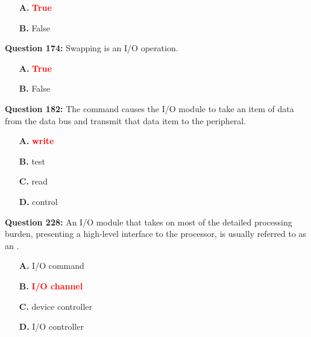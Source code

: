 \documentclass[12pt,a4paper]{article}
\begin{document}
\begin{itemize}
    \item[\textbf{A.}] \textcolor{red}{\textbf{True}}
    \item[\textbf{B.}] False
\end{itemize}

\vspace{0.5cm}

\vspace{0.5cm}

\textbf{Question 174:} Swapping is an I/O operation.

\begin{itemize}
    \item[\textbf{A.}] \textcolor{red}{\textbf{True}}
    \item[\textbf{B.}] False
\end{itemize}

\vspace{0.5cm}

\vspace{0.5cm}

\textbf{Question 182:} The \underline{\hspace{1.5cm}} command causes the I/O module to take an item of data from the data bus and transmit that data item to the peripheral.

\begin{itemize}
    \item[\textbf{A.}] \textcolor{red}{\textbf{write}}
    \item[\textbf{B.}] test
    \item[\textbf{C.}] read
    \item[\textbf{D.}] control
\end{itemize}

\vspace{0.5cm}

\vspace{0.5cm}

\vspace{0.5cm}

\vspace{0.5cm}

\textbf{Question 228:} An I/O module that takes on most of the detailed processing burden, presenting a high-level interface to the processor, is usually referred to as an \underline{\hspace{1.5cm}}.

\begin{itemize}
    \item[\textbf{A.}] I/O command
    \item[\textbf{B.}] \textcolor{red}{\textbf{I/O channel}}
    \item[\textbf{C.}] device controller
    \item[\textbf{D.}] I/O controller
\end{itemize}
\end{document}
